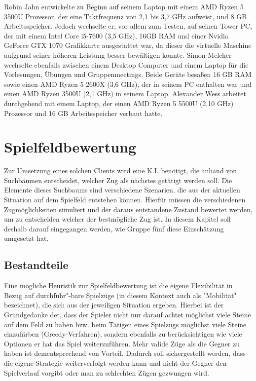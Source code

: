 \documentclass[12pt,a4paper,bibliography=totocnumbered,listof=totocnumbered]{article}
\begin{document}
Robin Jahn entwickelte zu Beginn auf seinem Laptop mit einem AMD Ryzen 5 3500U Prozessor, der eine Taktfrequenz von 2,1 bis 3,7 GHz aufweist, und 8 GB Arbeitsspeicher. Jedoch wechselte er, vor allem zum Testen, auf seinen Tower PC, der mit einem Intel Core i5-7600 (3,5 GHz), 16GB RAM und einer Nvidia GeForce GTX 1070 Grafikkarte ausgestattet war, da dieser die virtuelle Maschine aufgrund seiner höheren Leistung besser bewältigen konnte. Simon Melcher wechselte ebenfalls zwischen einem Desktop Computer und einem Laptop für die Vorlesungen, Übungen und Gruppenmeetings. Beide Geräte besaßen 16 GB RAM sowie einen AMD Ryzen 5 2600X (3,6 GHz), der in seinem PC enthalten war und einen AMD Ryzen 3500U (2,1 GHz) in seinem Laptop. Alexander Wess arbeitet durchgehend mit einem Laptop, der einen AMD Ryzen 5 5500U (2.10 GHz) Prozessor und 16 GB Arbeitsspeicher verbaut hatte.

\newpage
\section{Spielfeldbewertung}
Zur Umsetzung eines solchen Clients wird eine K.I. benötigt, die anhand von Suchbäumen entscheidet, welcher Zug als nächstes getätigt werden soll. Die Elemente dieses Suchbaums sind verschiedene Szenarien, die aus der aktuellen Situation auf dem Spielfeld entstehen können. Hierfür müssen die verschiedenen Zugmöglichkeiten simuliert und der daraus entstandene Zustand bewertet werden, um zu entscheiden welcher der bestmögliche Zug ist. 
In diesem Kapitel soll deshalb darauf eingegangen werden, wie Gruppe fünf diese Einschätzung umgesetzt hat.

\subsection{Bestandteile}\label{kap:Heuristik_Beschreibung}
Eine mögliche Heuristik zur Spielfeldbewertung ist die eigene Flexibilität in Bezug auf durchführ"-bare Spielzüge (in diesem Kontext auch als "Mobilität" bezeichnet), die sich aus der jeweiligen Situation ergeben. Hierbei ist der Grundgedanke der, dass der Spieler nicht nur darauf achtet möglichst viele Steine auf dem Feld zu haben bzw. beim Tätigen eines Spielzugs möglichst viele Steine einzufärben (Greedy-Verfahren), sondern ebenfalls zu berücksichtigen wie viele Optionen er hat das Spiel weiterzuführen. Mehr valide Züge als die Gegner zu haben ist dementsprechend von Vorteil. Dadurch soll sichergestellt werden, dass die eigene Strategie weiterverfolgt werden kann und nicht der Gegner den Spielverlauf vorgibt oder man zu \glqq schlechten\grqq{} Zügen gezwungen wird.
\end{document}
